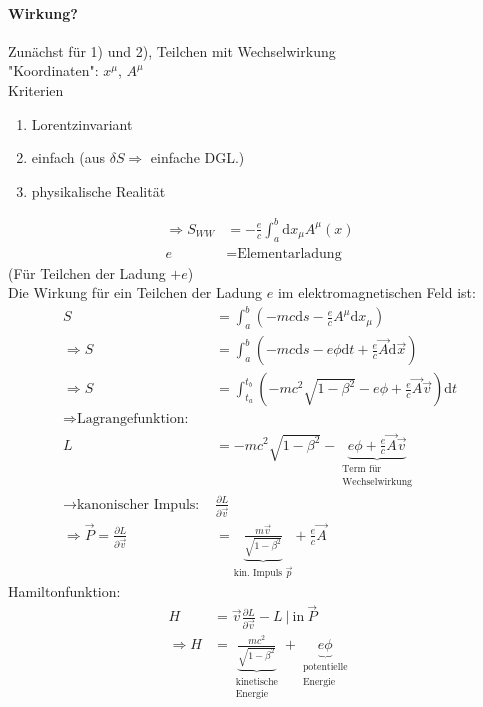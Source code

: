 \documentclass[a4paper]{article}
\begin{document}
\paragraph{Wirkung?\newline}
Zunächst für 1) und 2), Teilchen mit Wechselwirkung\\
"Koordinaten": $x^\mu$, $A^\mu$\\
Kriterien
\begin{enumerate}
  \item Lorentzinvariant
  \item einfach (aus $\delta\!S \Rightarrow$ einfache DGL.)
  \item physikalische Realität
\end{enumerate}
\begin{align}
  \Rightarrow S_{WW}&=-\frac{e}{c}\int_a^b \mathrm{d}x_\mu A^\mu(x)\\
  e&=\text{Elementarladung}
\end{align}
(Für Teilchen der Ladung $+e$)\\
Die Wirkung für ein Teilchen der Ladung $e$ im elektromagnetischen Feld ist:
\begin{align}
S&=\int^b_a\left(-mc\mathrm{d}s-\frac{e}{c}A^\mu \mathrm{d}x_\mu\right)\\
\Rightarrow S&=\int^b_a\left(-mc\mathrm{d}s-e\phi \mathrm{d}t +\frac{e}{c}\vec{A}\mathrm{d}\vec{x}\right)\\
\Rightarrow S&=\int^{t_b}_{t_a}\left(-mc^2\sqrt{1-\beta^2}-e\phi
+\frac{e}{c}\vec{A}\vec{v}\right) \mathrm{d}t\\
\nonumber\Rightarrow \text{Lagrangefunktion:}&\\
L&=-mc^2\sqrt{1-\beta^2}-\underbrace{e\phi+\frac{e}{c}\vec{A}\vec{v}}_{\substack{\text{Term
für}\\\text{Wechselwirkung}}}\\
\rightarrow \text{kanonischer Impuls: } &\frac{\partial L}{\partial \vec{v}}\\
\Rightarrow \vec{P}=\frac{\partial L}{\partial
\vec{v}}&=\underbrace{\frac{m\vec{v}}{\sqrt{1-\beta^2}}}_{\text{kin. Impuls }
\vec{p}}+\frac{e}{c}\vec{A}
\end{align} 
Hamiltonfunktion:
\begin{align}
H&=\vec{v}\frac{\partial L}{\partial \vec{v}}-L\ |\ \text{in}\ \vec{P}\\
\Rightarrow
H&=\underbrace{\frac{mc^2}{\sqrt{1-\beta^2}}}_{\substack{\text{kinetische}\\
\text{Energie}}}+ \underbrace{e\phi}_{\substack{\text{potentielle}\\
\text{Energie}}}
\end{align}
\end{document}
